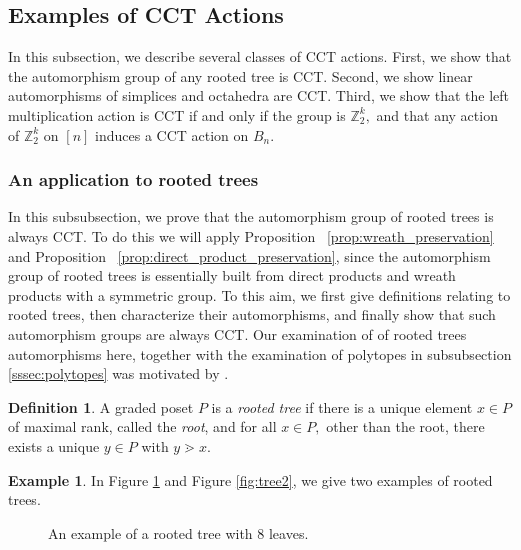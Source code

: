 \documentclass[10 pt]{amsart}
\theoremstyle{plain}
\theoremstyle{definition}
\newtheorem{defn}[thm]{Definition}
\newtheorem{eg}[thm]{Example}
\theoremstyle{remark}
\numberwithin{equation}{section}
\newcommand\ssec{\subsection}
\newcommand\sssec{\subsubsection}
\begin{document}
\ssec{Examples of CCT Actions}\label{ssec:CCT_examples}

In this subsection, we describe several classes of CCT actions. First, we show that the automorphism group of any rooted tree is CCT. Second, we show linear automorphisms of simplices and octahedra are CCT. Third, we show that the left multiplication action is CCT if and only if the group is $\mathbb Z_2^k,$ and that any action of $\mathbb Z_2^k$ on $[n]$ induces a CCT action on $B_n.$

\sssec{An application to rooted trees}
\label{ssec:rooted_trees}
In this subsubsection, we prove that the automorphism group of rooted trees is always CCT. To do this we will apply Proposition ~\ref{prop:wreath_preservation} and Proposition ~\ref{prop:direct_product_preservation}, since the automorphism group of rooted trees is essentially built from direct products and wreath products with a symmetric group. To this aim, we first give definitions relating to rooted trees, then characterize their automorphisms, and finally show that such automorphism groups are always CCT. Our examination of of rooted trees automorphisms here, together with the examination of polytopes in subsubsection \ref{sssec:polytopes} was motivated by \cite[Section 5]{permutation_polytopes}.

\begin{defn}
A graded poset $P$ is a {\it rooted tree} if there is a unique element $x \in P$ of maximal rank, called the {\it root}, and for all $x \in P,$ other than the root, there exists a unique $y \in P$ with $y \gtrdot x.$
\end{defn}

\begin{eg}
In Figure \ref{fig:tree1} and Figure \ref{fig:tree2}, we give two examples of rooted trees.
\end{eg}
\begin{figure}[h!]
\caption{\label{fig:tree1} An example of a rooted tree with $8$ leaves.}
\end{figure}
\end{document}
